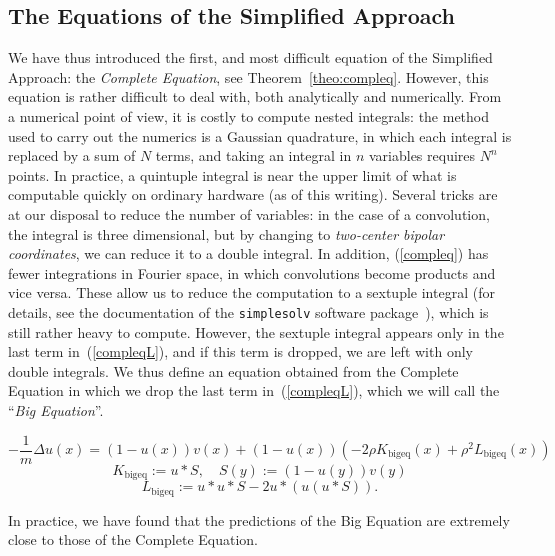 \documentclass{ian}
\begin{document}
\subsection{The Equations of the Simplified Approach}
\indent
We have thus introduced the first, and most difficult equation of the Simplified Approach: the {\it Complete Equation}, see Theorem\-~\ref{theo:compleq}.
However, this equation is rather difficult to deal with, both analytically and numerically.
From a numerical point of view, it is costly to compute nested integrals: the method used to carry out the numerics is a Gaussian quadrature, in which each integral is replaced by a sum of $N$ terms, and taking an integral in $n$ variables requires $N^n$ points.
In practice, a quintuple integral is near the upper limit of what is computable quickly on ordinary hardware (as of this writing).
Several tricks are at our disposal to reduce the number of variables: in the case of a convolution, the integral is three dimensional, but by changing to {\it two-center bipolar coordinates}, we can reduce it to a double integral.
In addition, (\ref{compleq}) has fewer integrations in Fourier space, in which convolutions become products and vice versa.
These allow us to reduce the computation to a sextuple integral (for details, see the documentation of the {\tt simplesolv} software package\-~\cite{ss}), which is still rather heavy to compute.
However, the sextuple integral appears only in the last term in\-~(\ref{compleqL}), and if this term is dropped, we are left with only double integrals.
We thus define an equation obtained from the Complete Equation in which we drop the last term in\-~(\ref{compleqL}), which we will call the ``{\it Big Equation}''.
\bigskip

  \begin{equation}
    -\frac1m\Delta u(x)
    =
    (1-u(x))v(x)+(1-u(x))\left(-2\rho K_{\mathrm{bigeq}}(x)+\rho^2 L_{\mathrm{bigeq}}(x)\right)
    \label{bigeq}
  \end{equation}
  \begin{equation}
    K_{\mathrm{bigeq}}:=
    u\ast S
    ,\quad
    S(y):=(1-u(y))v(y)
    \label{bigeqK}
  \end{equation}
  \nopagebreakaftereq
  \begin{equation}
    L_{\mathrm{bigeq}}:=
    u\ast u\ast S
    -2u\ast(u(u\ast S))
    .
  \label{bigeqL}
  \end{equation}
\endtheo
\restorepagebreakaftereq
\bigskip

In practice, we have found that the predictions of the Big Equation are extremely close to those of the Complete Equation.
\bigskip
\end{document}
